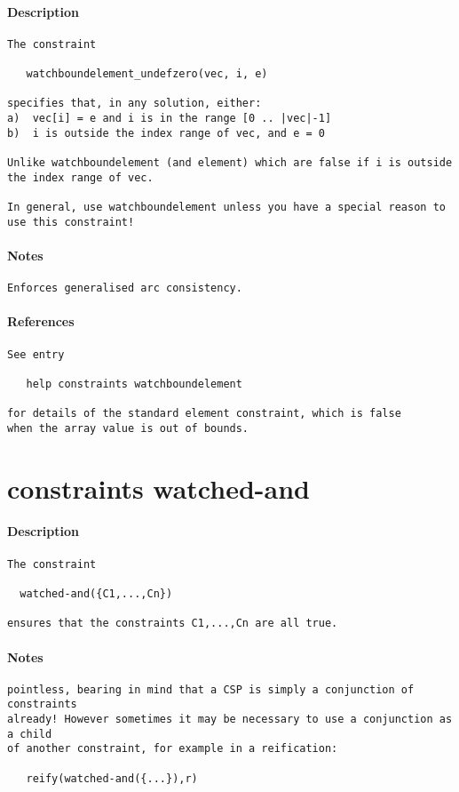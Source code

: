 \paragraph{Description}
{\footnotesize
\begin{verbatim}
The constraint

   watchboundelement_undefzero(vec, i, e)

specifies that, in any solution, either:
a)  vec[i] = e and i is in the range [0 .. |vec|-1]
b)  i is outside the index range of vec, and e = 0

Unlike watchboundelement (and element) which are false if i is outside
the index range of vec.

In general, use watchboundelement unless you have a special reason to
use this constraint!
\end{verbatim}
}
\paragraph{Notes}
{\footnotesize
\begin{verbatim}
Enforces generalised arc consistency.
\end{verbatim}
}
\paragraph{References}
{\footnotesize
\begin{verbatim}
See entry

   help constraints watchboundelement

for details of the standard element constraint, which is false
when the array value is out of bounds.
\end{verbatim}
}
\section{constraints watched-and}
\paragraph{Description}
{\footnotesize
\begin{verbatim}
The constraint

  watched-and({C1,...,Cn})

ensures that the constraints C1,...,Cn are all true.
\end{verbatim}
}
\paragraph{Notes}
{\footnotesize
\begin{verbatim}
pointless, bearing in mind that a CSP is simply a conjunction of constraints
already! However sometimes it may be necessary to use a conjunction as a child
of another constraint, for example in a reification:

   reify(watched-and({...}),r)
\end{verbatim}
}
